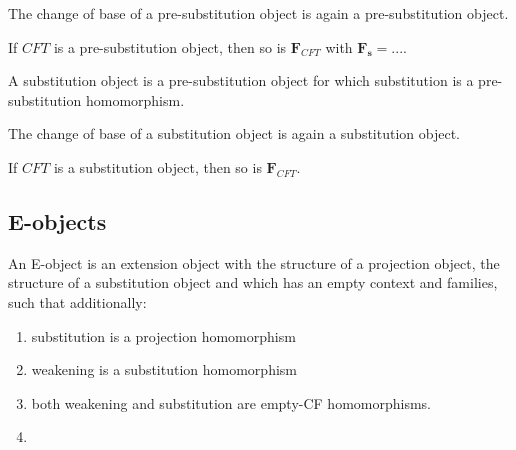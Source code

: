 \begin{lem}
The change of base of a pre-substitution object is again a pre-substitution object.
\end{lem}

\begin{lem}
If $CFT$ is a pre-substitution object, then so is $\mathbf{F}_{CFT}$ with
$\mathbf{F}_{\mathbf{s}}=...$.
\end{lem}

\begin{defn}
A substitution object is a pre-substitution object for which substitution is
a pre-substitution homomorphism.
\end{defn}

\begin{cor}
The change of base of a substitution object is again a substitution object.
\end{cor}

\begin{cor}
If $CFT$ is a substitution object, then so is $\mathbf{F}_{CFT}$.
\end{cor}

\subsection{E-objects}
\begin{defn}
An E-object is an extension object with the structure of a projection object,
the structure of a substitution object and which has an empty context and families,
such that additionally:
\begin{enumerate}
\item substitution is a projection homomorphism
\item weakening is a substitution homomorphism
\item both weakening and substitution are empty-CF homomorphisms.
\item 
\end{enumerate}
\end{defn}
